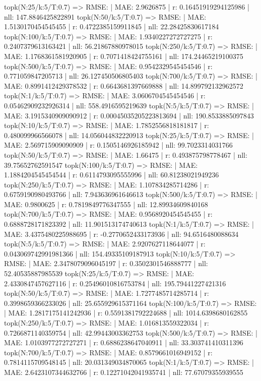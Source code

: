 topk(N:25/k:5/T:0.7) => RMSE: | MAE: 2.9626875 | r: 0.16451919294125986 | nll: 147.8846425822891
topk(N:50/k:5/T:0.7) => RMSE: | MAE: 1.5130170454545455 | r: 0.4722385159911845 | nll: 22.28425830617184
topk(N:100/k:5/T:0.7) => RMSE: | MAE: 1.9340227272727275 | r: 0.2407379613163421 | nll: 56.21867880978015
topk(N:250/k:5/T:0.7) => RMSE: | MAE: 1.1768361581920905 | r: 0.7071418424755161 | nll: 174.24465219100375
topk(N:500/k:5/T:0.7) => RMSE: | MAE: 0.9542329545454546 | r: 0.771059847205713 | nll: 26.127450506805403
topk(N:700/k:5/T:0.7) => RMSE: | MAE: 0.8991412429378532 | r: 0.6643681397669888 | nll: 14.899792132962572
topk(N:1/k:5/T:0.7) => RMSE: | MAE: 3.0606704545454546 | r: 0.05462909232926314 | nll: 558.4916595219639
topk(N:5/k:5/T:0.7) => RMSE: | MAE: 3.1915340909090912 | r: 0.00045035205223813694 | nll: 190.8533885097843
topk(N:10/k:5/T:0.7) => RMSE: | MAE: 1.7852556818181817 | r: 0.480099966566078 | nll: 14.056044832220913
topk(N:25/k:5/T:0.7) => RMSE: | MAE: 2.569715909090909 | r: 0.1505146926185942 | nll: 99.7023314031766
topk(N:50/k:5/T:0.7) => RMSE: | MAE: 1.66475 | r: 0.493875798778467 | nll: 39.75652762591547
topk(N:100/k:5/T:0.7) => RMSE: | MAE: 1.1884204545454544 | r: 0.6114793095555996 | nll: 60.81238021949236
topk(N:250/k:5/T:0.7) => RMSE: | MAE: 1.107834285714286 | r: 0.6759190980493766 | nll: 7.943636961646613
topk(N:500/k:5/T:0.7) => RMSE: | MAE: 0.9800625 | r: 0.7819849776347555 | nll: 12.89934609840168
topk(N:700/k:5/T:0.7) => RMSE: | MAE: 0.9568920454545455 | r: 0.6888728171823392 | nll: 11.901513174740613
topk(N:1/k:5/T:0.7) => RMSE: | MAE: 3.4375480225988695 | r: -0.2770652433173936 | nll: 94.6516480088634
topk(N:5/k:5/T:0.7) => RMSE: | MAE: 2.9207627118644077 | r: 0.043069742991981366 | nll: 154.49335109187913
topk(N:10/k:5/T:0.7) => RMSE: | MAE: 2.3478079096045197 | r: 0.3502301546888777 | nll: 52.40535887985539
topk(N:25/k:5/T:0.7) => RMSE: | MAE: 2.4330847457627116 | r: 0.25496010816753784 | nll: 195.79441227421316
topk(N:50/k:5/T:0.7) => RMSE: | MAE: 1.7277485714285714 | r: 0.3998659366233026 | nll: 25.655929615371164
topk(N:100/k:5/T:0.7) => RMSE: | MAE: 1.2817175141242936 | r: 0.5591381792224688 | nll: 1014.6398680162855
topk(N:250/k:5/T:0.7) => RMSE: | MAE: 1.016813559322034 | r: 0.7266871140359754 | nll: 42.99443003362753
topk(N:500/k:5/T:0.7) => RMSE: | MAE: 1.0103977272727271 | r: 0.6886238647040911 | nll: 33.303741410311396
topk(N:700/k:5/T:0.7) => RMSE: | MAE: 0.8579661016949152 | r: 0.7814115709548145 | nll: 20.031349034870065
topk(N:1/k:5/T:0.7) => RMSE: | MAE: 2.6423107344632766 | r: 0.12271042041935741 | nll: 77.67079355939555
